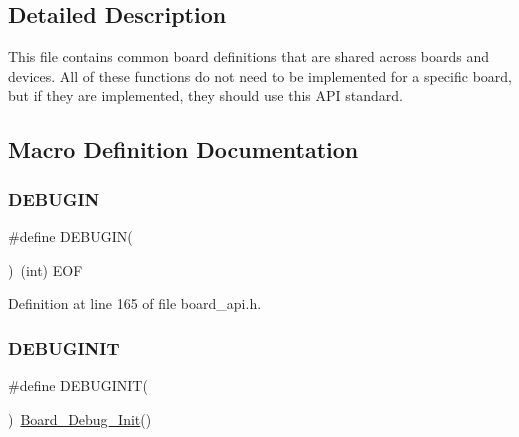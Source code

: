 \subsection{Detailed Description}
This file contains common board definitions that are shared across boards and devices. All of these functions do not need to be implemented for a specific board, but if they are implemented, they should use this A\+PI standard. 

\subsection{Macro Definition Documentation}
\mbox{\label{group___b_o_a_r_d___c_o_m_m_o_n___a_p_i_gad87de76956f23e36f51356aaed5c18e4}} 
\subsubsection{\texorpdfstring{D\+E\+B\+U\+G\+IN}{DEBUGIN}}
{\footnotesize\ttfamily \#define D\+E\+B\+U\+G\+IN(\begin{DoxyParamCaption}{ }\end{DoxyParamCaption})~(int) E\+OF}



Definition at line 165 of file board\+\_\+api.\+h.

\mbox{\label{group___b_o_a_r_d___c_o_m_m_o_n___a_p_i_ga5f3d8b382683793eb0b2723083f518f8}} 
\subsubsection{\texorpdfstring{D\+E\+B\+U\+G\+I\+N\+IT}{DEBUGINIT}}
{\footnotesize\ttfamily \#define D\+E\+B\+U\+G\+I\+N\+IT(\begin{DoxyParamCaption}{ }\end{DoxyParamCaption})~\hyperlink{group___b_o_a_r_d___c_o_m_m_o_n___a_p_i_gabcba073f50ad637ee6bc852f64ea2ce6}{Board\+\_\+\+Debug\+\_\+\+Init}()}



